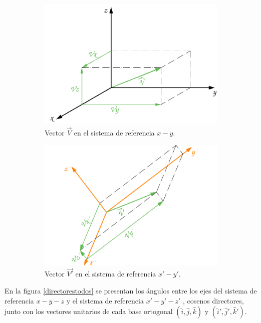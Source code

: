 \documentclass[12pt,letterpaper]{article}
\begin{document}
\begin{figure}[h]
\begin{subfigure}[l]{0.450\textwidth}
		\includegraphics[width=\textwidth]{img/Vector1Componentes3D.pdf}
		\caption{Vector $\overset{\rightarrow}{V}$ en el sistema de referencia $x-y$.}
		\label{vector1comp3d}
	\end{subfigure}
	\hspace{.5 cm}
	\begin{subfigure}[r]{0.450\textwidth}
		\includegraphics[width=\textwidth]{img/Vector2Componentes3D.pdf}
		\caption{Vector $\overset{\rightarrow}{V'}$ en el sistema de referencia $x'-y'$.}
		\label{vector2comp3d}
	\end{subfigure}	
	\caption{}
	\label{directores}
\end{figure}
%
%
%
%
%
En la figura \ref{directorestodos} se presentan los ángulos entre los ejes del sistema de referencia $x-y-z$ y el sistema de referencia $x'-y'-z'$ , cosenos directores, junto con los vectores unitarios de cada base ortogonal $\left( \hat{i}, \hat{j}, \hat{k} \right)$ y $\left( \hat{i}', \hat{j}', \hat{k}' \right)$.\\\\
\end{document}
